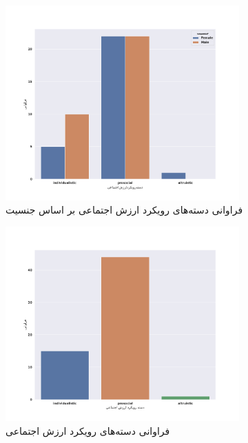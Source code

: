 \begin{figure}[htpb]
    \centering
    \includegraphics[width=0.8\textwidth]{./img/SVOAgainstPopulationSexBarPlot.png}
    \caption{فراوانی دسته‌های رویکرد ارزش اجتماعی بر اساس جنسیت}
    \label{fig:SVOAgainstPopulationSexBarPlot}
\end{figure}
\begin{figure}[htpb]
    \centering
    \includegraphics[width=0.8\textwidth]{./img/SVOAgainstPopulationBarPlot.pdf}
    \caption{فراوانی دسته‌های رویکرد ارزش اجتماعی}
    \label{fig:SVOAgainstPopulationBarPlot}
\end{figure}
